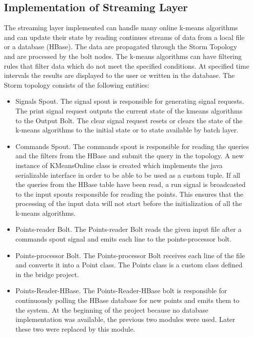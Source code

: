 \documentclass{lmproj}
\begin{document}
\subsection{Implementation of Streaming Layer}

The streaming layer implemented can handle many online k-means algorithms and can update their state by reading continues streams of data from a local file or a database (HBase). The data are propagated through the Storm Topology and are processed by the bolt nodes. The k-means algorithms can have filtering rules that filter data which do not meet the specified conditions. At specified time intervals the results are displayed to the user or written in the database. The Storm topology consists of the following entities:


\begin{itemize}
	\item Signals Spout. The signal spout is responsible for generating signal requests. The print signal request outputs the current state of the kmeans algorithms to the Output Bolt. The clear signal request resets or clears the state of the k-means algorithms to the initial state or to state available by batch layer.
	\item Commands Spout. The commands spout is responsible for reading the queries and the filters from the HBase and submit the query in the topology. A new instance of KMeansOnline class is created which implements the java serializable interface in order to be able to be used as a custom tuple. If all the queries from the HBase table have been read, a run signal is broadcasted to the input spouts responsible for reading the points. This ensures that the processing of the input data will not start before the initialization of all the k-means algorithms. 
	\item Points-reader Bolt. The Points-reader Bolt reads the given input file after a commands spout signal and emits each line to the points-processor bolt.
	\item Points-processor Bolt. The Points-processor Bolt receives each line of the file and converts it into a Point class.  The Points class is a custom class defined in the bridge project.
	\item Points-Reader-HBase. The Points-Reader-HBase bolt is responsible for continuously polling the HBase database for new points and emits them to the system. At the beginning of the project because no database implementation was available, the previous two modules were used. Later these two were replaced by this module. 

\end{itemize}
\end{document}
